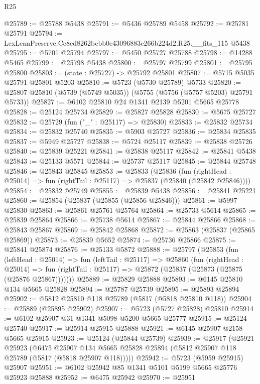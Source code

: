 \begin{lexlean}{R25}
\begin{coremodule}
@25789 := @25788 @5438
@25791 := @5436 @25789 @5458
@25792 := @25781 @25791
@25794 := LexLeanPreserve.Cc8ed8262bcbb0e43096883c266b224d2.R25.__fits_115 @5438
@25795 := @5701 @25794
@25797 := @5450 @25727 @25788
@25798 := @14288 @5465
@25799 := @25798 @5438
@25800 := @25797 @25799
@25801 := @25795 @25800
@25803 := (state : @25727) -> @25792 @25801
@25807 := @5715 @5035 @25791 @25801 @5203
@25810 := @5723 (@5730 @25789) @5733
@25820 := @25807 @25810 (@5739 (@5749 @5035)) (@5755 (@5756 (@5757 @5203) @25791 @5733))
@25827 := @6102 @25810 @24 @1341 @2139 @5201 @5665 @25778
@25828 := @25124 @25734
@25829 := @25827 @25828
@25830 := @5675 @25727
@25832 := @25729 (fun ("_" : @25117) => @25830)
@25833 := @25832 @25734
@25834 := @25832 @25740
@25835 := @5903 @25727
@25836 := @25834 @25835
@25837 := @5949 @25727
@25838 := @5724 @25117
@25839 := @25838 @25726
@25840 := @25839 @25221
@25841 := @25838 @25117
@25842 := @25841 @5438
@25843 := @25133 @5571
@25844 := @25737 @25117
@25845 := @25844 @25748
@25846 := @25843 @25845
@25853 := @25833
    (@25836
      (fun (rightHead : @25014) => fun (rightTail : @25117) => @25837 (@25840 (@25842 @25846))))
@25854 := @25832 @25749
@25855 := @25839 @5438
@25856 := @25841 @25221
@25860 := @25854 (@25837 (@25855 (@25856 @25846)))
@25861 := @5997 @25830
@25863 := @25861 @25761 @25764
@25864 := @25733 @5614
@25865 := @25839 @25864
@25866 := @25738 @5614
@25867 := @25844 @25866
@25868 := @25843 @25867
@25869 := @25842 @25868
@25872 := @25863 (@25837 (@25865 @25869))
@25873 := @25839 @5652
@25874 := @25736 @25866
@25875 := @25841 @25874
@25876 := @25133 @5872
@25888 := @25797
    (@25853
      (fun (leftHead : @25014) =>
      fun (leftTail : @25117) =>
      @25860
        (fun (rightHead : @25014) =>
        fun (rightTail : @25117) => @25872 (@25837 (@25873 (@25875 (@25876 @25867)))))))
@25889 := @25829 @25888
@25893 := @6145 @25810 @134 @5665 @25828
@25894 := @25787 @25739
@25895 := @25893 @25894
@25902 := @5812 @25810 @118 @25789 (@5817 (@5818 @25810 @118))
@25904 := @25889 (@25895 @25902)
@25907 := @5723 (@5727 @25828) @25810
@25914 := @6102 @25907 @31 @1341 @5098 @5200 @5665 @25777
@25915 := @25124 @25740
@25917 := @25914 @25915 @25888
@25921 := @6145 @25907 @2158 @5665 @25915
@25923 := @25124 (@25844 @25739)
@25939 := @25917
    (@25921
      @25923
      (@6475
        @25907
        @134
        @5665
        @25828
        @25894
        (@5812 @25907 @118 @25789 (@5817 (@5818 @25907 @118)))))
@25942 := @5723 (@5959 @25915) @25907
@25951 := @6102 @25942 @85 @1341 @5101 @5199 @5665 @25776 @25923 @25888
@25952 := @6475 @25942
@25970 := @25951

\end{coremodule}
\end{lexlean}
